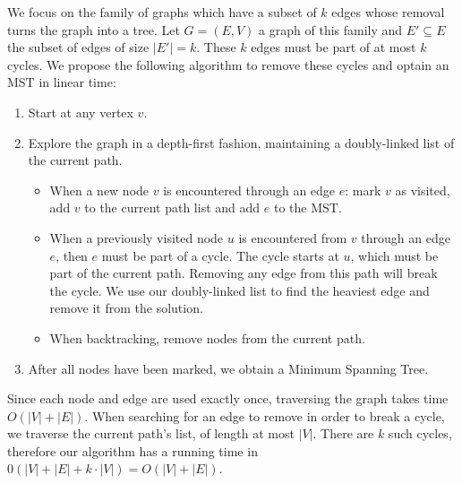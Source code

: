 
We focus on the family of graphs which have a subset of $k$ edges whose removal turns the graph into a tree. Let $G = (E, V)$ a graph of this family and $E' \subseteq E$ the subset of edges of size $|E'| = k$. These $k$ edges must be part of at most $k$ cycles. We propose the following algorithm to remove these cycles and optain an MST in linear time:

\begin{enumerate}
  \item Start at any vertex $v$.
  \item Explore the graph in a depth-first fashion, maintaining a doubly-linked list of the current path.
  \begin{itemize}
    \item When a new node $v$ is encountered through an edge $e$: mark $v$ as visited, add $v$ to the current path list and add $e$ to the MST.
    \item When a previously visited node $u$ is encountered from $v$ through an edge $e$, then $e$ must be part of a cycle. The cycle starts at $u$, which must be part of the current path. Removing any edge from this path will break the cycle. We use our doubly-linked list to find the heaviest edge and remove it from the solution.
    \item When backtracking, remove nodes from the current path.
  \end{itemize}
  \item After all nodes have been marked, we obtain a Minimum Spanning Tree.
\end{enumerate}

\noindent
Since each node and edge are used exactly once, traversing the graph takes time $O(|V| + |E|)$. When searching for an edge to remove in order to break a cycle, we traverse the current path's list, of length at most $|V|$. There are $k$ such cycles, therefore our algorithm has a running time in $0(|V| + |E| + k \cdot |V|) = O(|V| + |E|)$.
